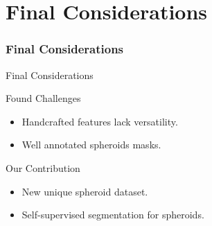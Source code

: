 \section{Final Considerations}


\begin{frame}{}
    \frametitle{Final Considerations}
\end{frame}


\begin{frame}{Final Considerations}
    \begin{block}{Found Challenges}
        \begin{itemize}
            \item Handcrafted features lack versatility.
            \item Well annotated spheroids masks.
        \end{itemize}
    \end{block}
    \begin{block}{Our Contribution}
        \begin{itemize}
            \item New unique spheroid dataset.
            \item Self-supervised segmentation for spheroids.
        \end{itemize}
    \end{block}
\end{frame}
